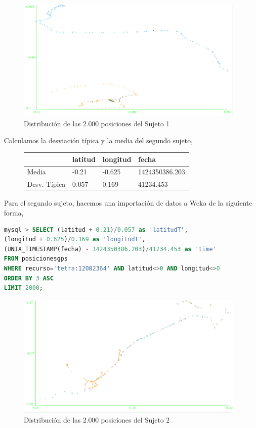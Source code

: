 \documentclass[a4paper, 12pt]{article}
\begin{document}
\begin{figure}[H]
	\includegraphics[scale=.5]{../comparativa/sujeto1.png}
	\caption{Distribuci\'on de las 2.000 posiciones del Sujeto 1}
\end{figure}

Calculamos la desviaci\'on t\'ipica y la media del segundo sujeto,\\

\begin{figure}[H]
	\begin{tabular}{| l | l | l | l |}
	\hline
	\rowcolor{LightCyan}
	\hline
  		& latitud & longitud & fecha \\
	\hline
		Media & -0.21 &  -0.625 & 1424350386.203 \\
		Desv. T\'ipica & 0.057 & 0.169 & 41234.453 \\
	\hline
	\end{tabular}
\end{figure}

Para el segundo sujeto, hacemos una importaci\'on de datos a Weka de la siguiente forma,\\

\begin{lstlisting}[language=sql, columns=fullflexible, basicstyle=\small, frame=tblr]
mysql > SELECT (latitud + 0.21)/0.057 as 'latitudT', 
(longitud + 0.625)/0.169 as 'longitudT', 
(UNIX_TIMESTAMP(fecha) - 1424350386.203)/41234.453 as 'time'
FROM posicionesgps
WHERE recurso='tetra:12082364' AND latitud<>0 AND longitud<>0
ORDER BY 3 ASC
LIMIT 2000;
\end{lstlisting}

\begin{figure}[H]
	\includegraphics[scale=.5]{../comparativa/sujeto2.png}
	\caption{Distribuci\'on de las 2.000 posiciones del Sujeto 2}
\end{figure}
\end{document}
